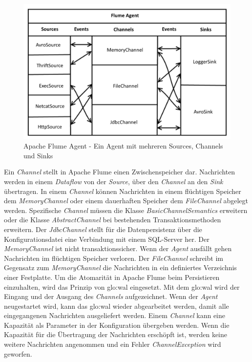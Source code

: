 \begin{figure}[htb!]
\centering
\includegraphics[width=1.0\textwidth]{bilder/flumeAgent.png}
\caption{Apache Flume Agent - Ein Agent mit mehreren Sources, Channels und Sinks
\label{fig:flumeAgent}}
\end{figure}

Ein \textit{Channel} stellt in Apache Flume einen Zwischenspeicher dar. Nachrichten werden in einem \textit{Dataflow} von der \textit{Source}, über den \textit{Channel} an den \textit{Sink} übertragen. In einem \textit{Channel} können Nachrichten in einem flüchtigen Speicher dem \textit{MemoryChannel} oder einem dauerhaften Speicher dem \textit{FileChannel} abgelegt werden. Spezifische \textit{Channel} müssen die Klasse \textit{BasicChannelSemantics}  erweitern oder die Klasse \textit{AbstractChannel} bei bestehenden Transaktionsmethoden erweitern. Der \textit{JdbcChannel} stellt für die Datenpersistenz über die Konfigurationsdatei eine Verbindung mit einem SQL-Server her. Der \textit{MemoryChannel} ist nicht transaktionssicher. Wenn der \textit{Agent} ausfällt gehen Nachrichten im flüchtigen Speicher verloren. Der \textit{FileChannel} schreibt im Gegensatz zum \textit{MemoryChannel} die Nachrichten in ein definiertes Verzeichnis einer Festplatte. Um die Atomarität in Apache Flume beim Persistieren einzuhalten, wird das Prinzip von \gls{glo:wal} eingesetzt. Mit dem \gls{glo:wal} wird der Eingang und der Ausgang des \textit{Channels} aufgezeichnet. Wenn der \textit{Agent} neugestartet wird, kann das \gls{glo:wal} wieder abgearbeitet werden, damit alle eingegangenen Nachrichten ausgeliefert werden. Einem \textit{Channel} kann eine Kapazität als Parameter in der Konfiguration übergeben werden. Wenn die Kapazität für die Übertragung der Nachrichten erschöpft ist, werden keine weitere Nachrichten angenommen und ein Fehler \textit{ChannelException} wird geworfen. 

